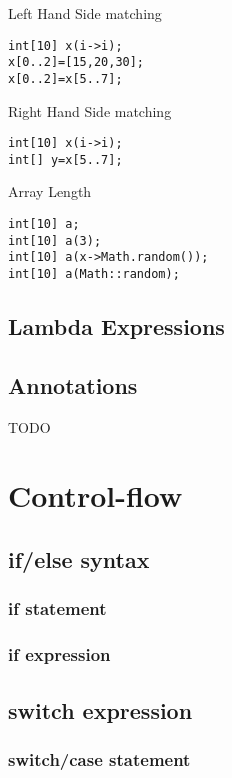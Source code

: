 \documentclass{tufte-book}
\begin{document}
                Left Hand Side matching
                \begin{lstlisting}
int[10] x(i->i);
x[0..2]=[15,20,30];
x[0..2]=x[5..7];
                \end{lstlisting}


                Right Hand Side matching
                \begin{lstlisting}
int[10] x(i->i);
int[] y=x[5..7];
                \end{lstlisting}

                Array Length
                \begin{lstlisting}
int[10] a;
int[10] a(3);
int[10] a(x->Math.random());
int[10] a(Math::random);
                \end{lstlisting}

            \section{Lambda Expressions}
            
            \section{Annotations}
            TODO

        \chapter{Control-flow}
            \section{if/else syntax}
            \subsection{if statement}
            \subsection{if expression}
            \section{switch expression}

            \subsection{switch/case statement}
\end{document}
